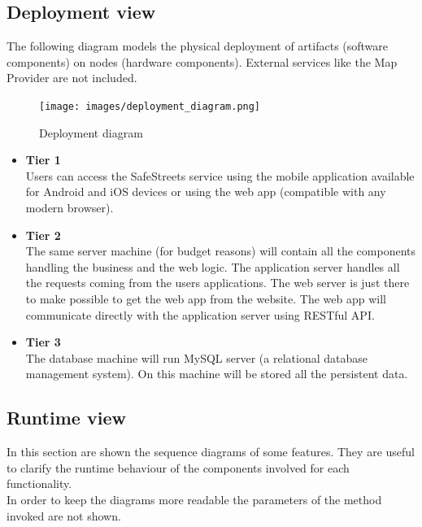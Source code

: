 \documentclass{article}
\begin{document}
\newpage

\subsection{Deployment view}
\label{sec:Deployment}
The following diagram models the physical deployment of artifacts (software components) on nodes (hardware components).
External services like the Map Provider are not included.
\begin{figure}[ht]
\centering
	\texttt{[image: images/deployment\_diagram.png]}
	\caption{Deployment diagram}
	\label{fig:deployment-diagram}
\end{figure}

	
\begin{itemize}
	\item \textbf{Tier 1} \\
		Users can access the SafeStreets service using the mobile application available for Android and iOS devices or using the web app (compatible with any modern browser).
	\item \textbf{Tier 2} \\ 
		The same server machine (for budget reasons)  will contain all the components handling the business and the web logic. The application server handles all the requests coming from the users applications. The web server is just there to make possible to get the web app from the website. The web app will communicate directly with the application server using RESTful API.
	\item \textbf{Tier 3} \\
		The database machine will run MySQL server (a relational database management system). On this machine will be stored all the persistent data.
\end{itemize}

\subsection{Runtime view}
\label{sec:Runtime}
 In this section are shown the sequence diagrams of some features. They are useful to clarify the runtime behaviour of the components involved for each functionality.\\
 In order to keep the diagrams more readable the parameters of the method invoked are not shown.
\newpage
\end{document}
